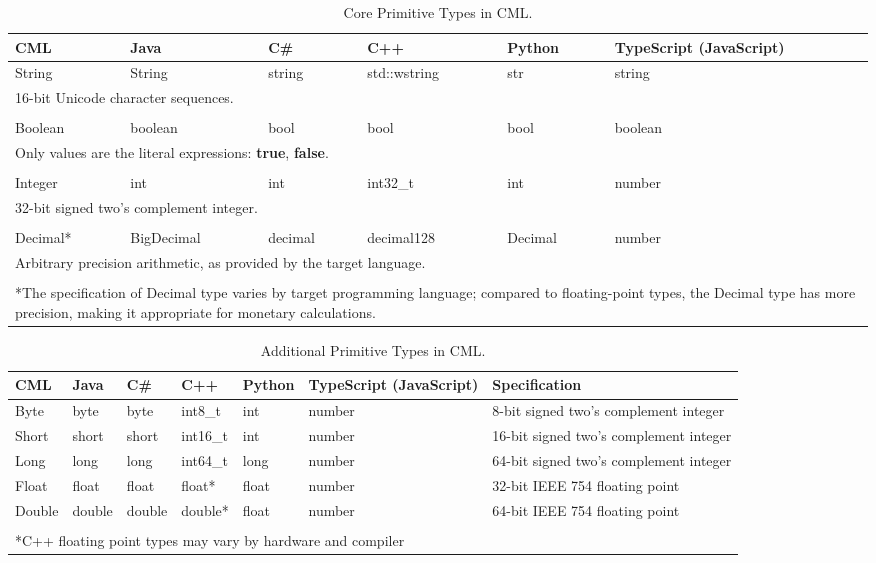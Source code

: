 \begin{table}[h]
\centering
\begin{tabular}
{l l l l l p{2cm} }
\hline
CML & Java & C\# & C++ & Python & TypeScript (JavaScript) \\
\hline
String & String & string & std::wstring & str & string \\
\multicolumn{6}{p{13cm}}{\footnotesize{16-bit Unicode character sequences.}} \\
\\
Boolean & boolean & bool & bool & bool & boolean \\
\multicolumn{6}{p{13cm}}{\footnotesize{Only values are the literal expressions: \textbf{true}, \textbf{false}.}}  \\
\\
Integer & int & int & int32\_t & int & number  \\
\multicolumn{6}{p{13cm}}{\footnotesize{32-bit signed two's complement integer.}}  \\
\\
Decimal* & BigDecimal & decimal & decimal128 & Decimal & number \\
\multicolumn{6}{p{13cm}}{\footnotesize{Arbitrary precision arithmetic, as provided by the target language.}} \\
\\
\multicolumn{6}{p{13cm}}{*The specification of Decimal type varies by target programming language;
compared to floating-point types, the Decimal type has more precision,
making it appropriate for monetary calculations.}
\end{tabular}
\caption{Core Primitive Types in CML.}
\label{tab:core-primitive-types}
\end{table}

\begin{table}[h]
\centering
\begin{tabular}
{l l l l l p{2cm} p{3.5cm} }
\hline
CML & Java & C\# & C++ & Python & TypeScript (JavaScript) & Specification \\
\hline
Byte & byte & byte & int8\_t & int & number & 8-bit signed two's complement integer \\
Short & short & short & int16\_t & int & number & 16-bit signed two's complement integer \\
Long & long & long & int64\_t & long & number & 64-bit signed two's complement integer \\
Float & float & float & float* & float & number & 32-bit IEEE 754 floating point \\
Double & double & double & double* & float & number & 64-bit IEEE 754 floating point \\
\\
\multicolumn{7}{p{12cm}}{*C++ floating point types may vary by hardware and compiler}
\end{tabular}
\caption{Additional Primitive Types in CML.}
\label{tab:additional-primitive-types}
\end{table}

